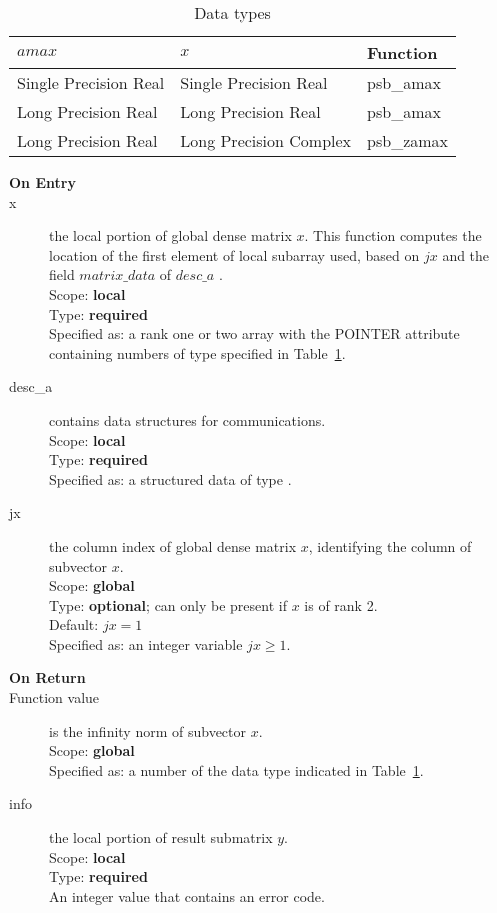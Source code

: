 
\begin{table}[h]
\begin{center}
\begin{tabular}{lll}
\hline
$amax$ & $x$ & {\bf Function}\\
\hline
Single Precision Real&Single Precision Real & psb\_amax\\
Long Precision Real&Long Precision Real & psb\_amax \\
Long Precision Real&Long Precision Complex & psb\_zamax \\
\hline
\end{tabular}
\end{center}
\caption{Data types\label{tab:f90amax}}
\end{table}


\begin{description}
\item[\bf On Entry]
\item[x] the local portion of global dense matrix
$x$. This function computes the location of the first element of
local subarray used, based on $jx$ and the field $matrix\_data$ of $desc\_a$ . \\
Scope: {\bf local} \\
Type: {\bf required} \\
Specified as:  a rank one or two array with the POINTER attribute 
containing numbers of type specified in
Table~\ref{tab:f90amax}.
\item[desc\_a] contains data structures for communications.\\
Scope: {\bf local} \\
Type: {\bf required}\\
Specified as: a structured data of type \descdata.
\item[jx]  the column index of global dense matrix $x$,
identifying the column of subvector $x$.\\
Scope: {\bf global} \\
Type: {\bf optional}; can only be present if $x$ is of rank 2.\\	
Default: $jx = 1$\\	
Specified as: an integer variable $jx\ge 1$. 

\item[\bf On Return] 
\item[Function value] is the infinity norm of subvector $x$.\\
Scope: {\bf global} \\
Specified as: a number of the data type indicated in Table~\ref{tab:f90amax}.
\item[info] the local portion of result submatrix $y$.\\
Scope: {\bf local} \\
Type: {\bf required} \\
An integer value that contains an error code. 
\end{description}
%
%

